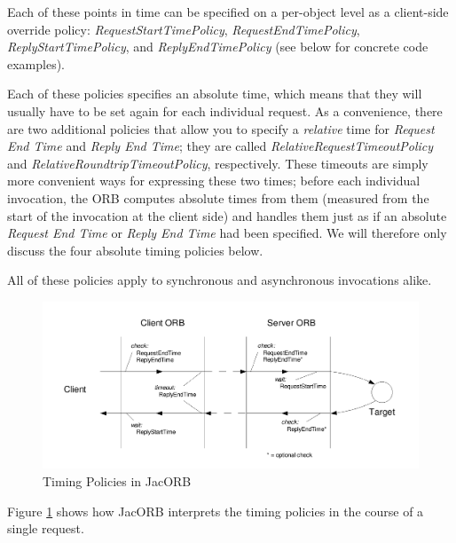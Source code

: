 Each of these points in time can be specified on a per-object level as
a client-side override policy: \mbox{\emph{RequestStartTimePolicy}},
\emph{RequestEndTimePolicy}, \emph{ReplyStartTimePolicy}, and
\emph{ReplyEndTimePolicy} (see below for concrete code examples).

Each of these policies specifies an absolute time, which means that
they will usually have to be set again for each individual
request.  As a convenience, there are two additional policies that
allow you to specify a \emph{relative} time for \emph{Request End
Time} and \emph{Reply End Time}; they are called
\emph{RelativeRequestTimeoutPolicy} and
\emph{RelativeRoundtripTimeoutPolicy}, respectively.  These timeouts
are simply more convenient ways for expressing these two times;
before each individual invocation, the ORB computes absolute times
from them (measured from the start of the invocation at the client
side) and handles them just as if an absolute \emph{Request End Time}
or \emph{Reply End Time} had been specified.  We will therefore only
discuss the four absolute timing policies below.

All of these policies apply to synchronous and asynchronous
invocations alike.

\begin{figure}[htb]
  \begin{center}
    \includegraphics[width=16cm]{QoS/Timing}
  \end{center}
\caption{Timing Policies in JacORB}
\label{fig:timing}
\end{figure}

Figure \ref{fig:timing} shows how JacORB interprets the timing
policies in the course of a single request.

